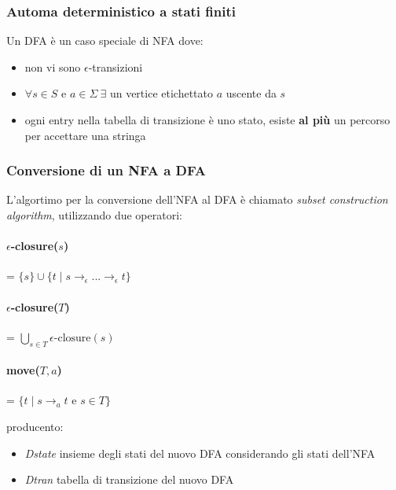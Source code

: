 \subsubsection{Automa deterministico a stati finiti}
Un DFA è un caso speciale di NFA dove:
\begin{itemize}
\item non vi sono $\epsilon$-transizioni
\item $\forall s \in S \text{ e } a \in \Sigma \ \exists$ un vertice etichettato
$a$ uscente da $s$
\item ogni entry nella tabella di transizione è uno stato, esiste
\textbf{al più} un percorso per accettare una stringa
\end{itemize}

\subsubsection{Conversione di un NFA a DFA}
\label{sec:NFA_to_DFA}
L'algortimo per la conversione dell'NFA al DFA è chiamato
\textit{subset construction algorithm}, utilizzando due operatori:

\paragraph{$\epsilon$-closure($s$)} = $\{s\} \cup \{t \mid s \to_\epsilon ...
\to_\epsilon t\}$
\paragraph{$\epsilon$-closure($T$)} = $\bigcup_{s \in T}
\epsilon\text{-closure}(s)$
\paragraph{move($T,a$)} = $\{t \mid s \to_a t \text{ e } s \in T\}$

\bigskip

producento:
\begin{itemize}
\item \textit{Dstate} insieme degli stati del nuovo DFA considerando gli stati
dell'NFA
\item \textit{Dtran} tabella di transizione del nuovo DFA
\end{itemize}

